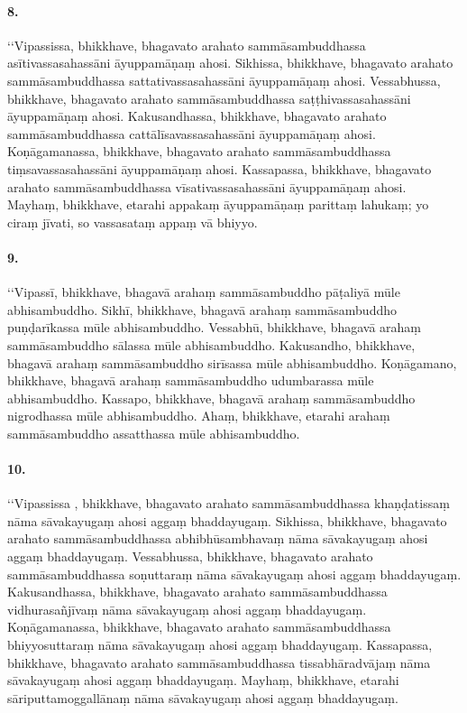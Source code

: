 \paragraph{8.} ‘‘Vipassissa, bhikkhave, bhagavato arahato sammāsambuddhassa asītivassasahassāni āyuppamāṇaṃ ahosi. Sikhissa, bhikkhave, bhagavato arahato sammāsambuddhassa sattativassasahassāni āyuppamāṇaṃ ahosi. Vessabhussa, bhikkhave, bhagavato arahato sammāsambuddhassa saṭṭhivassasahassāni āyuppamāṇaṃ ahosi. Kakusandhassa, bhikkhave, bhagavato arahato sammāsambuddhassa cattālīsavassasahassāni āyuppamāṇaṃ ahosi. Koṇāgamanassa, bhikkhave, bhagavato arahato sammāsambuddhassa tiṃsavassasahassāni āyuppamāṇaṃ ahosi. Kassapassa, bhikkhave, bhagavato arahato sammāsambuddhassa vīsativassasahassāni āyuppamāṇaṃ ahosi. Mayhaṃ, bhikkhave, etarahi appakaṃ āyuppamāṇaṃ parittaṃ lahukaṃ; yo ciraṃ jīvati, so vassasataṃ appaṃ vā bhiyyo.

\paragraph{9.} ‘‘Vipassī, bhikkhave, bhagavā arahaṃ sammāsambuddho pāṭaliyā mūle abhisambuddho. Sikhī, bhikkhave, bhagavā arahaṃ sammāsambuddho puṇḍarīkassa mūle abhisambuddho. Vessabhū, bhikkhave, bhagavā arahaṃ sammāsambuddho sālassa mūle abhisambuddho. Kakusandho, bhikkhave, bhagavā arahaṃ sammāsambuddho sirīsassa mūle abhisambuddho. Koṇāgamano, bhikkhave, bhagavā arahaṃ sammāsambuddho udumbarassa mūle abhisambuddho. Kassapo, bhikkhave, bhagavā arahaṃ sammāsambuddho nigrodhassa mūle abhisambuddho. Ahaṃ, bhikkhave, etarahi arahaṃ sammāsambuddho assatthassa mūle abhisambuddho.

\paragraph{10.} ‘‘Vipassissa , bhikkhave, bhagavato arahato sammāsambuddhassa khaṇḍatissaṃ nāma sāvakayugaṃ ahosi aggaṃ bhaddayugaṃ. Sikhissa, bhikkhave, bhagavato arahato sammāsambuddhassa abhibhūsambhavaṃ nāma sāvakayugaṃ ahosi aggaṃ bhaddayugaṃ. Vessabhussa, bhikkhave, bhagavato arahato sammāsambuddhassa soṇuttaraṃ nāma sāvakayugaṃ ahosi aggaṃ bhaddayugaṃ. Kakusandhassa, bhikkhave, bhagavato arahato sammāsambuddhassa vidhurasañjīvaṃ nāma sāvakayugaṃ ahosi aggaṃ bhaddayugaṃ. Koṇāgamanassa, bhikkhave, bhagavato arahato sammāsambuddhassa bhiyyosuttaraṃ nāma sāvakayugaṃ ahosi aggaṃ bhaddayugaṃ. Kassapassa, bhikkhave, bhagavato arahato sammāsambuddhassa tissabhāradvājaṃ nāma sāvakayugaṃ ahosi aggaṃ bhaddayugaṃ. Mayhaṃ, bhikkhave, etarahi sāriputtamoggallānaṃ nāma sāvakayugaṃ ahosi aggaṃ bhaddayugaṃ.

